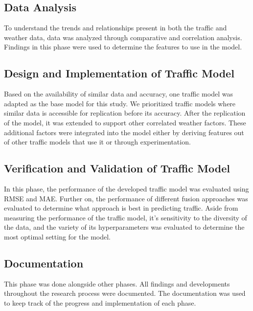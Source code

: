 \subsection{Data Analysis}
To understand the trends and relationships present in both the traffic and weather data, data was analyzed through comparative and correlation analysis. Findings in this phase were used to determine the features to use in the model.

\subsection{Design and Implementation of Traffic Model}
Based on the availability of similar data and accuracy, one traffic model was adapted as the base model for this study. We prioritized traffic models where similar data is accessible for replication before its accuracy. After the replication of the model, it was extended to support other correlated weather factors. These additional factors were integrated into the model either by deriving features out of other traffic models that use it or through experimentation. 

\subsection{Verification and Validation of Traffic Model}
In this phase, the performance of the developed traffic model was evaluated using RMSE and MAE. Further on, the performance of different fusion approaches was evaluated to determine what approach is best in predicting traffic. Aside from measuring the performance of the traffic model, it’s sensitivity to the diversity of the data, and the variety of its hyperparameters was evaluated to determine the most optimal setting for the model. 


\subsection{Documentation}
This phase was done alongside other phases. All findings and developments throughout the research process were documented. The documentation was used to keep track of the progress and implementation of each phase.



